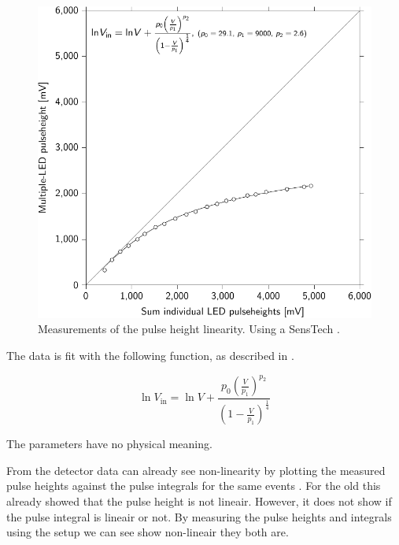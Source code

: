 \begin{figure}
    \centering
    \includegraphics{plots/calibration/linearity_senstech_ph}
    \caption{Measurements of the pulse height linearity. Using a
             SensTech \pmt.}
    \label{fig:linearity_senstech_ph}
\end{figure}

The data is fit with the following function, as described in
\cite{icecube:pmt}.

\begin{equation}
    \ln V_{\mathrm{in}} = \ln V +
                          \frac{p_0 \left(\frac{V}{p_1}\right)^{p_2}}
                               {\left(1 - \frac{V}{p_1}\right)^{\frac{1}{4}}}
\end{equation}

The parameters have no physical meaning.


From the detector data can already see non-linearity by plotting the
measured pulse heights against the pulse integrals for the same events
. For the old \pmts this
already showed that the pulse height is not lineair. However, it does
not show if the pulse integral is lineair or not. By measuring the pulse
heights and integrals using the setup we can see show non-lineair they
both are.

